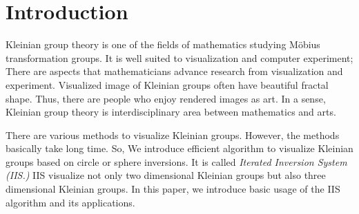 
\section{Introduction}

Kleinian group theory is one of the fields of mathematics studying 
M\"obius transformation groups.
It is well suited to visualization and computer experiment;
There are aspects that mathematicians advance research from
visualization and experiment.
Visualized image of Kleinian groups often have beautiful fractal shape.
Thus, there are people who enjoy rendered images as art.
In a sense, Kleinian group theory is interdisciplinary area between
mathematics and arts.

There are various methods to visualize Kleinian groups.
However, the methods basically take long time.
So, We introduce efficient algorithm to visualize Kleinian groups based on
circle or sphere inversions.
It is called \textit{Iterated Inversion System (IIS.)} 
IIS visualize not only two dimensional Kleinian groups but also three
dimensional Kleinian groups.
In this paper, we introduce basic usage of the IIS algorithm and its
applications.
